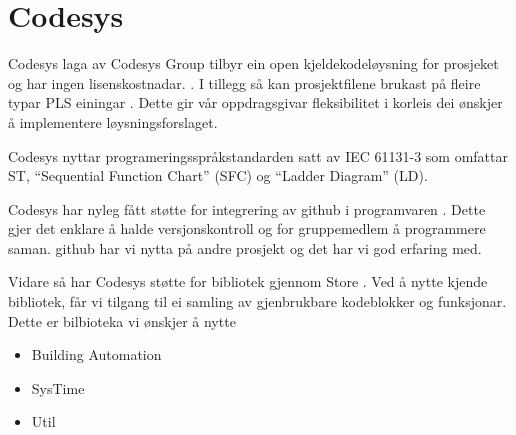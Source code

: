 \section{Codesys}
\thispagestyle{fancy}
\gls{Codesys} \citep{Codesys} laga av \gls{Codesys} Group tilbyr ein open kjeldekodeløysning for prosjeket og har ingen lisenskostnadar. \citep{CodesysLisens}. 
I tillegg så kan prosjektfilene brukast på fleire typar PLS einingar \citep{CodesysPLS}. 
Dette gir vår oppdragsgivar fleksibilitet i korleis dei ønskjer å implementere løysningsforslaget.

\gls{Codesys} nyttar programeringsspråkstandarden satt av \gls{IEC} 61131-3 som omfattar \gls{ST}, ``Sequential Function Chart'' (\gls{SFC}) og ``Ladder Diagram'' (\gls{LD}). 

\gls{Codesys} har nyleg fått støtte for integrering av \gls{github} i programvaren \citep{CodesysGIT}. 
Dette gjer det enklare å halde versjonskontroll og for gruppemedlem å programmere saman. 
\gls{github} har vi nytta på andre prosjekt og det har vi god erfaring med.

Vidare så har \gls{Codesys} støtte for bibliotek gjennom  Store \citep{CodesysStore}. 
Ved å nytte kjende bibliotek, får vi tilgang til ei samling av gjenbrukbare kodeblokker og funksjonar.
Dette er bilbioteka vi ønskjer å nytte

\begin{itemize}
    \item {} Building Automation \citep{BuildingAutomation}
    \item SysTime \citep{DateAndTime}
    \item Util \citep{Util}
\end{itemize}


\newpage
